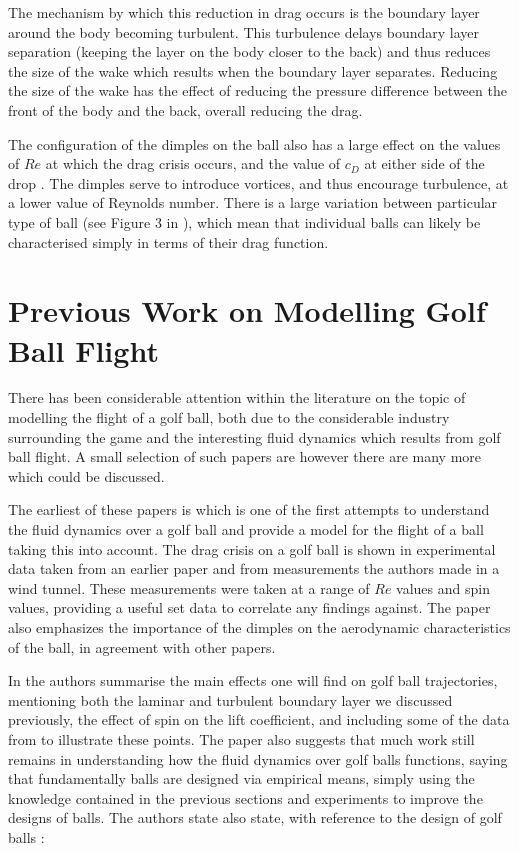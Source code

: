 The mechanism by which this reduction in drag occurs is the boundary layer around the body becoming 
turbulent. This turbulence delays boundary layer separation (keeping the layer on the body closer to
the back) and thus reduces the size of the wake which results when the boundary layer separates. Reducing
the size of the wake has the effect of reducing the pressure difference between the front of the body
and the back, overall reducing the drag.

The configuration of the dimples on the ball also has a large effect on the values of $Re$ at which 
the drag crisis occurs, and the value of $c_D$ at either side of the drop \citet{Naruo2014}. The dimples
serve to introduce vortices, and thus encourage turbulence, at a lower value of Reynolds number. There is
a large variation between particular type of ball (see Figure 3 in \citet{Naruo2014}), which mean that
individual balls can likely be characterised simply in terms of their drag function.

\section{Previous Work on Modelling Golf Ball Flight}

There has been considerable attention within the literature on the topic of modelling the flight of a
golf ball, both due to the considerable industry surrounding the game and the interesting fluid
dynamics which results from golf ball flight. A small selection of such papers are
\citet{Smits2004,Bearman1976,Penner2003,Alam2011,Kensrud2010,Leong2007} however there are many more
which could be discussed.

The earliest of these papers is \citet{Bearman1976} which is one of the first attempts
to understand the fluid dynamics over a golf ball and provide a model for the flight of a ball taking
this into account. The drag crisis on a golf ball is shown in experimental data taken from an earlier
paper and from measurements the authors made in a wind tunnel. These measurements were taken at a range
of $Re$ values and spin values, providing a useful set data to correlate any findings against. The
paper also emphasizes the importance of the dimples on the aerodynamic characteristics of the ball,
in agreement with other papers.

In \citet{Smits2004} the authors summarise the main effects one will find on golf ball trajectories,
mentioning both the laminar and turbulent boundary layer we discussed previously, the effect of spin
on the lift coefficient, and including some of the data from \citet{Bearman1976} to illustrate these
points. The paper also suggests that much work still remains in understanding how the fluid dynamics
over golf balls functions, saying that fundamentally balls are designed via empirical means, simply
using the knowledge contained in the previous sections and experiments to improve the designs of balls.
The authors state also state, with reference to the design of golf balls \citet[page 10]{Smits2004}:

